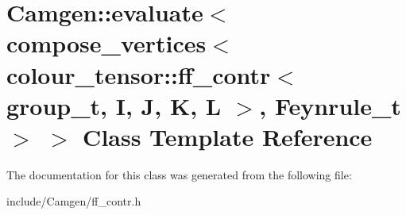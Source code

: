 \hypertarget{a00172}{}\section{Camgen\+:\+:evaluate$<$ compose\+\_\+vertices$<$ colour\+\_\+tensor\+:\+:ff\+\_\+contr$<$ group\+\_\+t, I, J, K, L $>$, Feynrule\+\_\+t $>$ $>$ Class Template Reference}
\label{a00172}


The documentation for this class was generated from the following file\+:\begin{DoxyCompactItemize}
\item 
include/\+Camgen/ff\+\_\+contr.\+h\end{DoxyCompactItemize}
